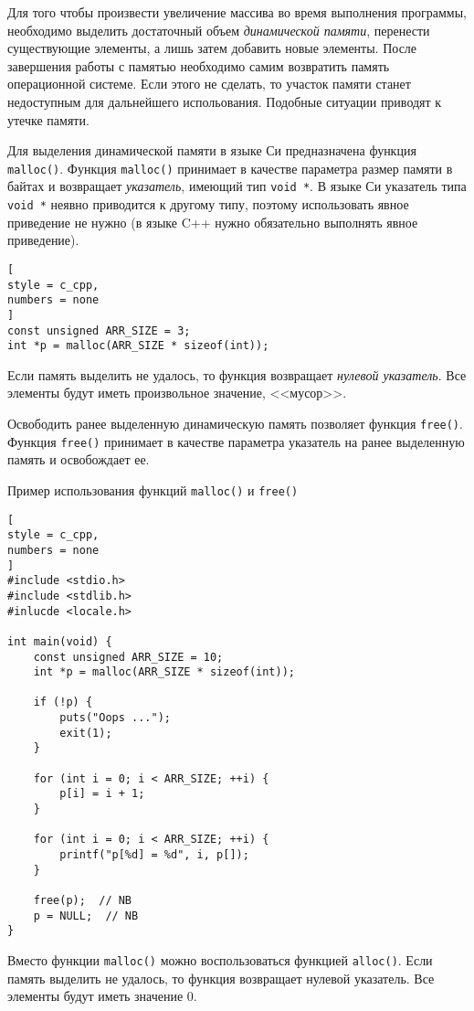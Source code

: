 \documentclass[%
	11pt,
	a4paper,
	utf8,
		]{article}
\begin{document}
Для того чтобы произвести  увеличение массива во время выполнения программы, необходимо выделить достаточный объем \emph{динамической памяти}, перенести существующие элементы, а лишь затем добавить новые элементы. После завершения работы с памятью необходимо самим возвратить память операционной системе. Если этого не сделать, то участок памяти станет недоступным для дальнейшего испольования. Подобные ситуации приводят к утечке памяти.

Для выделения динамической памяти в языке Си предназначена функция \verb*|malloc()|. Функция \verb|malloc()| принимает в качестве параметра размер памяти в байтах и возвращает \emph{указатель}, имеющий тип \verb|void *|. В языке Си указатель типа \verb|void *| неявно приводится к другому типу, поэтому использовать явное приведение не нужно (в языке C++ нужно обязательно выполнять явное приведение).

\begin{lstlisting}[
style = c_cpp,
numbers = none
]
const unsigned ARR_SIZE = 3;
int *p = malloc(ARR_SIZE * sizeof(int));
\end{lstlisting}

Если память выделить не удалось, то функция возвращает \emph{нулевой указатель}. Все элементы будут иметь произвольное значение, <<мусор>>.

Освободить ранее выделенную динамическую память позволяет функция \verb*|free()|. Функция \verb|free()| принимает в качестве параметра указатель на ранее выделенную память и освобождает ее.

Пример использования функций \verb*|malloc()| и \verb*|free()|
\begin{lstlisting}[
style = c_cpp,
numbers = none
]
#include <stdio.h>
#include <stdlib.h>
#inlucde <locale.h>

int main(void) {
    const unsigned ARR_SIZE = 10;
    int *p = malloc(ARR_SIZE * sizeof(int));
    
    if (!p) {
        puts("Oops ...");
        exit(1);
    }
    
    for (int i = 0; i < ARR_SIZE; ++i) {
        p[i] = i + 1;
    }
    
    for (int i = 0; i < ARR_SIZE; ++i) {
        printf("p[%d] = %d", i, p[]);
    }
    
    free(p);  // NB
    p = NULL;  // NB
}
\end{lstlisting}

Вместо функции \verb*|malloc()| можно воспользоваться функцией \verb|alloc()|. Если память выделить не удалось, то функция возвращает нулевой указатель. Все элементы будут иметь значение 0.
\end{document}
